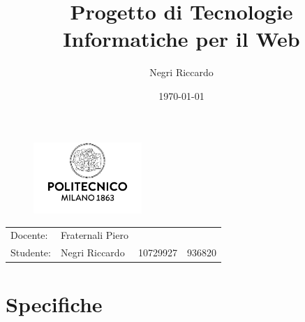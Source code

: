 \documentclass{article}
\title{\vspace{-2cm}Progetto di Tecnologie Informatiche per il Web} %
\author{Negri Riccardo} %
\date{\today}
\begin{document}
	
	\maketitle
	
	\begin{figure}[H]
		\centering
		\includegraphics[width=0.365\textwidth]{assets/logo.jpg}
	\end{figure}

	\begin{center}
		\begin{tabular}{l l l l}
			Docente: & Fraternali Piero& & \\ 
			Studente: & Negri Riccardo & 10729927 & 936820 
		\end{tabular}
	\end{center}
	
	\tableofcontents
	\pagebreak
	
	\section{Specifiche}
	
\end{document}
